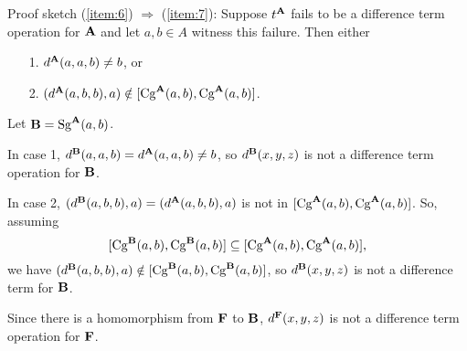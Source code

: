 \documentclass[12pt,xcolor=dvipsnames%
   ]{beamer}
\begin{document}
\begin{frame}[shrink=25]{Proof sketch}
  (\ref{item:6}) $\Rightarrow $ (\ref{item:7}):
  Suppose  $t^{\mathbf{A}}$ fails to be a difference term operation for $\mathbf{A}$ and let $a, b \in
  A$ witness this failure. Then either
  \begin{enumerate}
  \item[1.]\label{item:9} $d^{\mathbf{A}}(a,a,b) \neq b$, or
  \item[2.]\label{item:10} $(d^{\mathbf{A}}(a,b,b), a) \notin [\operatorname{Cg}^{\mathbf{A}} (a, b), \operatorname{Cg}^{\mathbf{A}} (a, b)]$.
  \end{enumerate}

  \vskip2mm
  \pause 
  Let $\mathbf{B} = \operatorname{Sg}^{\mathbf{A}} (a, b)$.  

  \vskip2mm
  In case 1,
  $d^{\mathbf{B}}(a,a,b) = d^{\mathbf{A}}(a,a,b) \neq b$, so $d^{\mathbf{B}}(x,y,z)$ is not a difference
  term operation for $\mathbf{B}$.
  
\vskip2mm
\pause
In case 2,
  $(d^{\mathbf{B}}(a,b,b), a) = (d^{\mathbf{A}}(a,b,b), a)$ is not in $[\operatorname{Cg}^{\mathbf{A}} (a, b), \operatorname{Cg}^{\mathbf{A}} (a, b)]$.
  So, assuming 
  \[[\operatorname{Cg}^{\mathbf{B}} (a, b), \operatorname{Cg}^{\mathbf{B}} (a, b)] \subseteq [\operatorname{Cg}^{\mathbf{A}} (a, b), \operatorname{Cg}^{\mathbf{A}} (a, b)],\]
  we have $(d^{\mathbf{B}}(a,b,b), a) \notin [\operatorname{Cg}^{\mathbf{B}} (a, b), \operatorname{Cg}^{\mathbf{B}} (a, b)]$, so
  $d^{\mathbf{B}}(x,y,z)$ is not a difference term for $\mathbf{B}$.

  Since there is a homomorphism from $\mathbf{F}$ to $\mathbf{B}$,
  $d^{\mathbf{F}}(x,y,z)$ is not a difference term operation for $\mathbf{F}$.

\end{frame}
\end{document}
